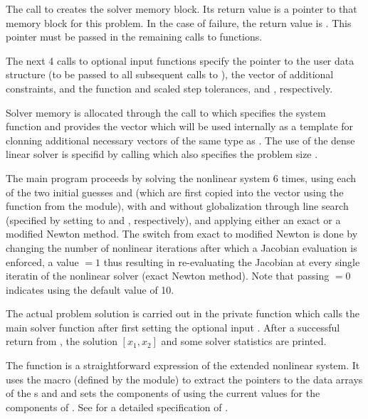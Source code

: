The call to  creates the {\kinsol} solver memory block.
Its return value is a pointer to that memory block for this
problem.  In the case of failure, the return value is .  This
pointer must be passed in the remaining calls to {\kinsol} functions.

The next 4 calls to {\kinsol} optional input functions specify the 
pointer to the user data structure (to be passed to all subsequent calls
to ), the vector of additional constraints, and the function and
scaled step tolerances,  and , respectively.

Solver memory is allocated through the call to  which
specifies the system function  and provides the vector 
which will be used internally as a template for clonning additional necessary
vectors of the same type as . 
The use of the dense linear solver is specifid by calling  which
also specifies the problem size .

The main program proceeds by solving the nonlinear system 6 times, using 
each of the two initial guesses  and  (which are first copied
into the vector  using the  function from
the {\nvecs} module), with and without globalization through line search
(specified by setting  to  and ,
respectively), and applying either an exact or a modified Newton method.
The switch from exact to modified Newton is done by changing the number of 
nonlinear iterations after which a Jacobian evaluation is enforced, a value
$=1$ thus resulting in re-evaluating the Jacobian at every single
iteratin of the nonlinear solver (exact Newton method). Note that passing
$=0$ indicates using the default {\kinsol} value of 10.

The actual problem solution is carried out in the private function 
which calls the main solver function  after first setting the optional
input . After a successful return from , the solution
$[x_1, x_2]$ and some solver statistics are printed. 

The function  is a straightforward expression of the extended nonlinear 
system. It uses the macro  (defined by the {\nvecs} module)
to extract the pointers to the data arrays of the s  and 
and sets the components of  using the current values for the components
of .
See  for a detailed specification of .

